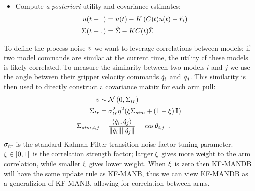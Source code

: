 \begin{algorithm}[h]
\begin{algorithmic}
{\begin{enumerate}
{\begin{itemize}
{\begin{align*}
                                    S                                &= C(t) \hat \utilityprocessnoisecovar C(t)^T + \observationnoisefactor^2 \\
                                    K                                &= \hat \utilityprocessnoisecovar C(t)^T S^{-1}
                                \end{align*}
                            }
                            \item{Compute \textit{a posteriori} utility and covariance estimates:
                                \begin{align*}
                                    \bar {u}(t + 1)             &= \bar {u}(t) - K \left( C(t) \bar {u}(t) - \tilde {r}_i \right) \\
                                    \Sigma(t + 1) &= \hat {\Sigma} - K C(t) \hat {\Sigma}
                                \end{align*}
                            }
                        \end{itemize}
                    }
                \end{enumerate}
            }
        \EndFor
    \end{algorithmic}
\end{algorithm}

To define the process noise $v$ we want to leverage correlations between models; if two model commands are similar at the current time, the utility of these models is likely correlated. To measure the similarity between two models $i$ and $j$ we use the angle between their gripper velocity commands $\dot{q}_{i}$ and $\dot{q}_{j}$. This similarity is then used to directly construct a covariance matrix for each arm pull:
{\begin{equation}
\begin{split}
    v            &\sim \mathcal{N}\left(0,\Sigma_{tr}\right)\\
    \Sigma_{tr}  & = \sigma_{tr}^2 \eta^2 (\xi \Sigma_{sim} + \left(1 - \xi\right) \mathbf{I})\\
    \Sigma_{sim,i,j} & = \frac{\langle \dot{q}_{i}, \dot{q}_{j} \rangle}{\| \dot{q}_{i} \| \| \dot{q}_{j} \|} = \cos \theta_{i,j} \enspace.
\label{eqn:processnoise}
\end{split}
\end{equation}}
$\sigma_{tr}$ is the standard Kalman Filter transition noise factor tuning parameter. $\xi \in [0,1]$ is the correlation strength factor; larger $\xi$ gives more weight to the arm correlation, while smaller $\xi$ gives lower weight. When $\xi$ is zero then KF-MANDB will have the same update rule as KF-MANB, thus we can view KF-MANDB as a generalizion of KF-MANB, allowing for correlation between arms.

